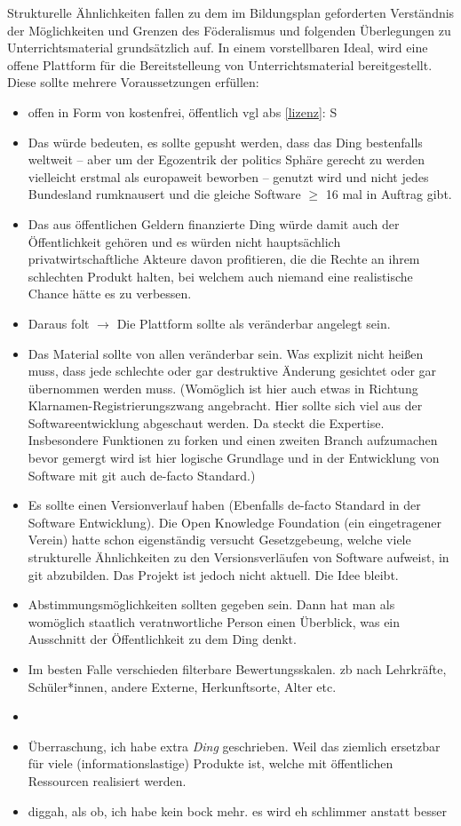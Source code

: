Strukturelle Ähnlichkeiten fallen zu dem im Bildungsplan geforderten Verständnis der Möglichkeiten und Grenzen des Föderalismus und folgenden Überlegungen zu Unterrichtsmaterial grundsätzlich auf.
In einem vorstellbaren Ideal, wird eine offene Plattform für die Bereitstelleung von Unterrichtsmaterial bereitgestellt.
Diese sollte mehrere Voraussetzungen erfüllen:
\begin{itemize}
    \item offen in Form von kostenfrei, öffentlich \gls{vgl} \gls{abs} \ref{lizenz}: \gls{S} \pageref{lizenz}
    \item Das würde bedeuten, es sollte gepusht werden, dass das Ding bestenfalls weltweit -- aber um der Egozentrik der politics Sphäre gerecht zu werden vielleicht erstmal als europaweit beworben -- genutzt wird und nicht jedes Bundesland rumknausert und die gleiche Software $\geq$ 16 mal in Auftrag gibt.
    \item Das aus öffentlichen Geldern finanzierte Ding würde damit auch der Öffentlichkeit gehören und es würden nicht hauptsächlich privatwirtschaftliche Akteure davon profitieren, die die Rechte an ihrem schlechten Produkt halten, bei welchem auch niemand eine realistische Chance hätte es zu verbessen.
    \item Daraus folt $\rightarrow$ Die Plattform sollte als veränderbar angelegt sein.
    \item Das Material sollte von allen veränderbar sein. Was explizit nicht heißen muss, dass jede schlechte oder gar destruktive Änderung gesichtet oder gar übernommen werden muss.
    (Womöglich ist hier auch etwas in Richtung Klarnamen-Registrierungszwang angebracht. Hier sollte sich viel aus der Softwareentwicklung abgeschaut werden. Da steckt die Expertise. Insbesondere Funktionen zu forken und einen zweiten Branch aufzumachen bevor gemergt wird ist hier logische Grundlage und in der Entwicklung von Software mit git auch de-facto Standard.)
    \item Es sollte einen Versionverlauf haben (Ebenfalls de-facto Standard in der Software Entwicklung). Die Open Knowledge Foundation (ein eingetragener Verein) hatte schon eigenständig versucht Gesetzgebeung, welche viele strukturelle Ähnlichkeiten zu den Versionsverläufen von Software aufweist, in git abzubilden. Das Projekt ist jedoch nicht aktuell. Die Idee bleibt.
    \item Abstimmungsmöglichkeiten sollten gegeben sein. Dann hat man als womöglich staatlich veratnwortliche Person einen Überblick, was ein Ausschnitt der Öffentlichkeit zu dem Ding denkt.
    \item Im besten Falle verschieden filterbare Bewertungsskalen. \Gls{zb} nach Lehrkräfte, Schüler*innen, andere Externe, Herkunftsorte, Alter etc.
    \item 
    \item Überraschung, ich habe extra \emph{Ding} geschrieben. Weil das ziemlich ersetzbar für viele (informationslastige) Produkte ist, welche mit öffentlichen Ressourcen realisiert werden.
    \item diggah, als ob, ich habe kein bock mehr. es wird eh schlimmer anstatt besser
\end{itemize}


